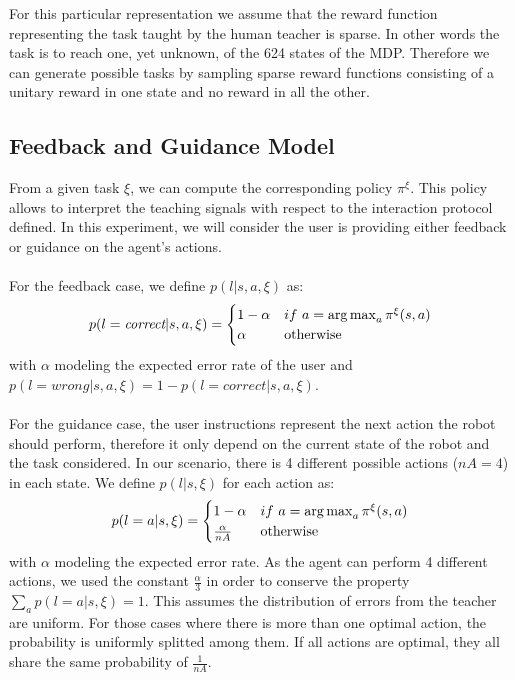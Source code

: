 For this particular representation we assume that the reward function representing the task taught by the human teacher is sparse. In other words the task is to reach one, yet unknown, of the 624 states of the MDP. Therefore we can generate possible tasks by sampling sparse reward functions consisting of a unitary reward in one state and no reward in all the other. 

\subsection{Feedback and Guidance Model}
\label{chapter:lfui:framemodels}

From a given task $\xi$, we can compute the corresponding policy $\pi^{\xi}$. This policy allows to interpret the teaching signals with respect to the interaction protocol defined. In this experiment, we will consider the user is providing either feedback or guidance on the agent's actions. 

\paragraph{} For the feedback case, we define $p(l |s,a,\xi)$ as:
%
\begin{equation}
    p(l = \emph{correct} |s,a,\xi) = 
    \begin{cases}
    1-\alpha               & if~a = \argmax_a \pi^{\xi}(s,a)\\
        \alpha             & \text{otherwise}\\
   \end{cases}
\end{equation}
%
with $\alpha$ modeling the expected error rate of the user and $p(l = wrong |s,a,\xi) = 1 - p(l = correct |s,a,\xi)$.

\paragraph{} For the guidance case, the user instructions represent the next action the robot should perform, therefore it only depend on the current state of the robot and the task considered. In our scenario, there is 4 different possible actions ($nA = 4$) in each state. We define $p(l |s, \xi)$ for each action as:
%
\begin{equation}
    p(l = a |s,\xi) = 
    \begin{cases}
        1-\alpha & if~a = \argmax_a \pi^{\xi}(s,a)\\
        \frac{\alpha}{nA} & \text{otherwise}\\
   \end{cases}
\end{equation}
%
with $\alpha$ modeling the expected error rate. As the agent can perform 4 different actions, we used the constant $\frac{\alpha}{3}$ in order to conserve the property $\sum_a p(l = a |s,\xi) = 1$. This assumes the distribution of errors from the teacher are uniform. For those cases where there is more than one optimal action, the probability is uniformly splitted among them. If all actions are optimal, they all share the same probability of $\frac{1}{nA}$.

